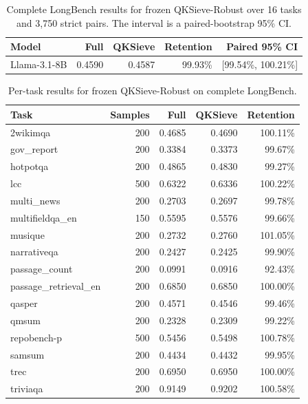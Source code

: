 \begin{table}[t]
\caption{Complete LongBench results for frozen QKSieve-Robust over 16 tasks and 3,750 strict pairs. The interval is a paired-bootstrap 95\% CI.}
\label{tab:longbench-main}
\centering
\small
\begin{tabular}{lrrrr}
\toprule
Model & Full & QKSieve & Retention & Paired 95\% CI \\
\midrule
Llama-3.1-8B & 0.4590 & 0.4587 & 99.93\% & [99.54\%, 100.21\%] \\
\bottomrule
\end{tabular}
\end{table}

\begin{table}[t]
\caption{Per-task results for frozen QKSieve-Robust on complete LongBench.}
\label{tab:longbench-per-task}
\centering
\small
\begin{tabular}{lrrrr}
\toprule
Task & Samples & Full & QKSieve & Retention \\
\midrule
2wikimqa & 200 & 0.4685 & 0.4690 & 100.11\% \\
gov\_report & 200 & 0.3384 & 0.3373 & 99.67\% \\
hotpotqa & 200 & 0.4865 & 0.4830 & 99.27\% \\
lcc & 500 & 0.6322 & 0.6336 & 100.22\% \\
multi\_news & 200 & 0.2703 & 0.2697 & 99.78\% \\
multifieldqa\_en & 150 & 0.5595 & 0.5576 & 99.66\% \\
musique & 200 & 0.2732 & 0.2760 & 101.05\% \\
narrativeqa & 200 & 0.2427 & 0.2425 & 99.90\% \\
passage\_count & 200 & 0.0991 & 0.0916 & 92.43\% \\
passage\_retrieval\_en & 200 & 0.6850 & 0.6850 & 100.00\% \\
qasper & 200 & 0.4571 & 0.4546 & 99.46\% \\
qmsum & 200 & 0.2328 & 0.2309 & 99.22\% \\
repobench-p & 500 & 0.5456 & 0.5498 & 100.78\% \\
samsum & 200 & 0.4434 & 0.4432 & 99.95\% \\
trec & 200 & 0.6950 & 0.6950 & 100.00\% \\
triviaqa & 200 & 0.9149 & 0.9202 & 100.58\% \\
\bottomrule
\end{tabular}
\end{table}


